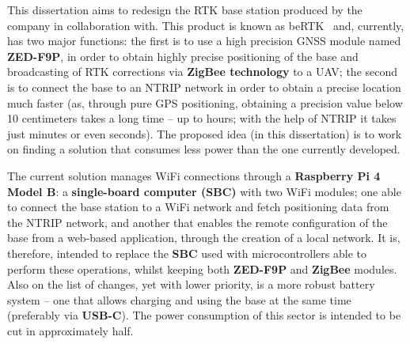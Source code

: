This dissertation aims to redesign the RTK base station produced by the company in collaboration with. This product is known as beRTK~\cite{beRTK_2022} and, currently, has two major functions: the first is to use a high precision GNSS module named \textbf{ZED-F9P}, in order to obtain highly precise positioning of the base and broadcasting of RTK corrections via \textbf{ZigBee technology} to a UAV; %
the second is to connect the base to an NTRIP network in order to obtain a precise location much faster (as, through pure GPS positioning, obtaining a precision value below 10 centimeters takes a long time -- up to hours; with the help of NTRIP it takes just minutes or even seconds).
The proposed idea (in this dissertation) is to work on finding a solution that consumes less power than the one currently developed.

The current solution manages WiFi connections through a \textbf{Raspberry Pi 4 Model B}: a \textbf{single-board computer (SBC)} with two WiFi modules;
one able to connect the base station to a WiFi network and fetch positioning data from the NTRIP network, and another that enables the remote configuration of the base from a web-based application, through the creation of a local network.
It is, therefore, intended to replace the \textbf{SBC} used with microcontrollers able to perform these operations, whilst keeping both \textbf{ZED-F9P} and \textbf{ZigBee} modules.
Also on the list of changes, yet with lower priority, is a more robust battery system -- one that allows charging and using the base at the same time (preferably via \textbf{USB-C}). The power consumption of this sector is intended to be cut in approximately half.
